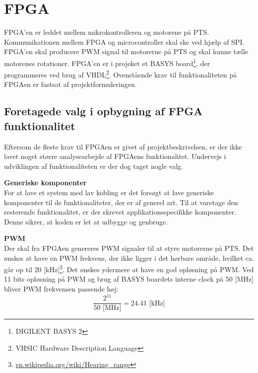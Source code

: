 \section{FPGA}
\label{sec:FPGA}
FPGA'en er leddet mellem mikrokontrolleren og motorene på PTS. 
Kommunikationen mellem FPGA og microcontroller skal ske ved hjælp af SPI. 
FPGA'en skal producere PWM signal til motorerne på PTS og skal kunne tælle motorenes rotationer. 
FPGA'en er i projeket et BASYS board\footnote{DIGILENT BASYS 2}, der programmeres ved brug af VHDL\footnote{VHSIC Hardware Description Language}.
Ovenstående krav til funktionaliteten på FPGAen er fastsat af 
projektformuleringen.

\subsection{Foretagede valg i opbygning af FPGA funktionalitet}
Eftersom de fleste krav til FPGAen er givet af projektbeskrivelsen, er der ikke 
lavet noget større analysearbejde af FPGAens funktionalitet. Undervejs i 
udviklingen af funktionaliteten er der dog taget nogle valg.

\textbf{Generiske komponenter}\\
For at lave et system med lav kobling er det forsøgt at lave 
generiske komponenter til de funktionaliteter, der er af generel art. 
Til at varetage den resterende funktionalitet, er der skrevet applikationsspecifikke 
komponenter.
Denne sikrer, at koden er let at udbygge og genbruge.

\textbf{PWM}\\
Der skal fra FPGAen genereres PWM signaler til at styre motorerne på PTS.
Det ønskes at have en PWM frekvens, der ikke ligger i det hørbare område, hvilket ca. går op til 20 [kHz]\footnote{\url{en.wikipedia.org/wiki/Hearing\_range}}. 
Det ønskes ydermere at have en god opløsning på PWM. 
Ved 11 bits opløsning på PWM og brug af BASYS boardets interne clock på 50 [MHz] bliver PWM frekvensen passende høj:
\begin{equation}
  \frac{2^{11}}{50 \text{ [MHz]}} = 24.41 \text{ [kHz]}
\end{equation}


